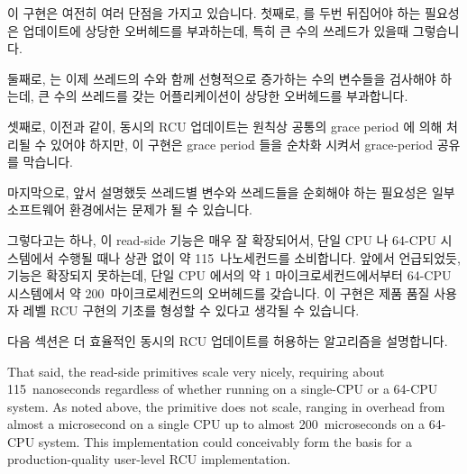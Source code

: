 이 구현은 여전히 여러 단점을 가지고 있습니다.
첫째로,  를 두번 뒤집어야 하는 필요성은 업데이트에 상당한
오버헤드를 부과하는데, 특히 큰 수의 쓰레드가 있을때 그렇습니다.

둘째로,  는 이제 쓰레드의 수와 함께 선형적으로 증가하는
수의 변수들을 검사해야 하는데, 큰 수의 쓰레드를 갖는 어플리케이션이 상당한
오버헤드를 부과합니다.

셋째로, 이전과 같이, 동시의 RCU 업데이트는 원칙상 공통의 grace period 에 의해
처리될 수 있어야 하지만, 이 구현은 grace period 들을 순차화 시켜서 grace-period
공유를 막습니다.

마지막으로, 앞서 설명했듯 쓰레드별 변수와 쓰레드들을 순회해야 하는 필요성은
일부 소프트웨어 환경에서는 문제가 될 수 있습니다.

\iffalse

This implementation still has several shortcomings.
First, the need to flip \co{rcu_idx} twice imposes substantial overhead
on updates, especially if there are large numbers of threads.

Second, \co{synchronize_rcu()} must now examine a number of variables
that increases linearly with the number of threads, imposing substantial
overhead on applications with large numbers of threads.

Third, as before, although concurrent RCU updates could in principle
be satisfied by a common grace period, this implementation serializes
grace periods, preventing grace-period sharing.

Finally, as noted in the text, the need for per-thread variables
and for enumerating threads may be problematic in some software
environments.

\fi

그렇다고는 하나, 이 read-side 기능은 매우 잘 확장되어서, 단일 CPU 나 64-CPU
 시스템에서 수행될 때나 상관 없이 약 115~나노세컨드를 소비합니다.
앞에서 언급되었듯,  기능은 확장되지 못하는데, 단일
 CPU 에서의 약 1 마이크로세컨드에서부터 64-CPU 시스템에서 약
200~마이크로세컨드의 오버헤드를 갖습니다.
이 구현은 제품 품질 사용자 레벨 RCU 구현의 기초를 형성할 수 있다고 생각될 수
있습니다.

다음 섹션은 더 효율적인 동시의 RCU 업데이트를 허용하는 알고리즘을 설명합니다.

\iffalse

That said, the read-side primitives scale very nicely, requiring about
115~nanoseconds regardless of whether running on a single-CPU or a 64-CPU
 system.
As noted above, the  primitive does not scale,
ranging in overhead from almost a microsecond on a single  CPU
up to almost 200~microseconds on a 64-CPU system.
This implementation could conceivably form the basis for a
production-quality user-level RCU implementation.

